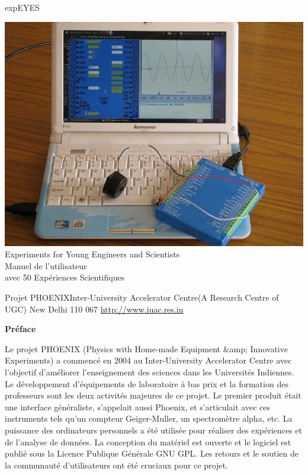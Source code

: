 \documentclass{book}
\begin{document}
\begin{titlepage}{\Large expEYES}\\[6em]
\begin{center}\includegraphics[width=1.0\textwidth]{eyes.jpg}\\[1em]
{\large Experiments for Young Engineers and Scientists}\\[6em]
{\Huge Manuel de l'utilisateur}\\[1em]
{\Large avec 50 Expériences Scientifiques}\\[3em]
\end{center}{\large Projet PHOENIXInter-University Accelerator Centre(A Research Centre of UGC) New Delhi 110 067 \href{http://www.iuac.res.in }{\mbox{http://www.iuac.res.in} }}\\
\end{titlepage}\pagebreak \tableofcontents \listoffigures\pagebreak









\textbf{Préface}






Le projet PHOENIX (Physics with Home-made Equipment \&amp; Innovative Experiments) a commencé en 2004 au Inter-University Accelerator Centre avec l'objectif d'améliorer l'enseignement des sciences dans les Universités Indiennes. Le développement d'équipements de laboratoire à bas prix et la formation des professeurs sont les deux activités majeures de ce projet. Le premier produit était une interface généraliste, s'appelait aussi Phoenix, et s'articulait avec ces instruments tels qu'un compteur Geiger-Muller, un spectromètre alpha, etc. La puissance des ordinateurs personnels a été utilisée pour réaliser des expériences et de l'analyse de données. La conception du matériel est ouverte et le logiciel est publié sous la Licence Publique Générale GNU GPL. Les retours et le soutien de la communauté d'utilisateurs ont été cruciaux pour ce projet.
\end{document}
